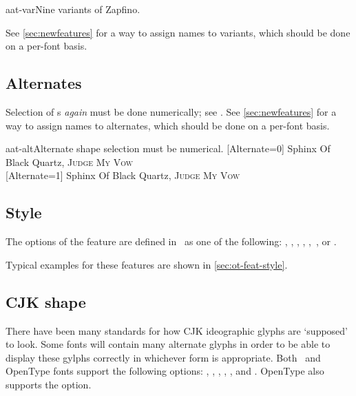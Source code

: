 \begin{Xexample}[firstline=2,lastline=9]{aat-var}{Nine variants of Zapfino.}
  \Huge \rule{0pt}{2cm}
  \hspace*{2cm}
\end{Xexample}

See \vref{sec:newfeatures} for a way to assign names to variants,
which should be done on a per-font basis.

\subsection{Alternates}

Selection of s \emph{again}
must be done numerically; see .
See \vref{sec:newfeatures} for a way to assign names to alternates,
which should be done on a per-font basis.

\begin{Xexample}{aat-alt}{Alternate shape selection must be numerical.}
  [Alternate=0]
   Sphinx Of Black Quartz, {\scshape Judge My Vow} \\
  [Alternate=1]
   Sphinx Of Black Quartz, {\scshape Judge My Vow}
\end{Xexample}


\subsection{Style}

The options of the  feature
are defined in \AAT\ as one of the following: ,
, , ,
,\footnotemark\ , or .

Typical examples for these features are shown in \ref{sec:ot-feat-style}.






\subsection{CJK shape}
There have been many standards for how CJK ideographic
glyphs are `supposed' to look. Some fonts will contain many alternate
glyphs in order to be able to display these gylphs
correctly in whichever form is appropriate. Both \AAT\ and OpenType
fonts support the following  options:
, , , ,
, and . OpenType also supports the  option.


